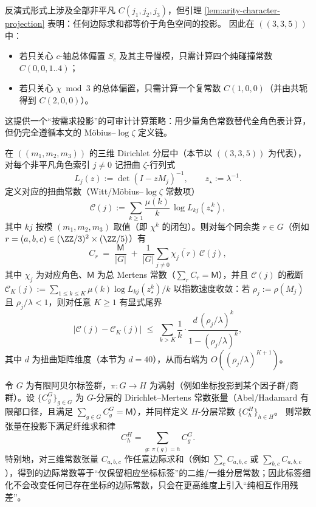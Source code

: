 \begin{remark}\label{rem:arity-335-projection-compression}
反演式形式上涉及全部非平凡 \(C(j_1,j_2,j_3)\)，但引理 \ref{lem:arity-character-projection} 表明：任何边际求和都等价于角色空间的投影。
因此在 \(((3,3,5))\) 中：
\begin{itemize}
  \item 若只关心 \(c\)-轴总体偏置 \(S_c\) 及其主导慢模，只需计算四个纯碰撞常数 \(C(0,0,1..4)\)；
  \item 若只关心 \(\chi\bmod 3\) 的总体偏置，只需计算一个复常数 \(C(1,0,0)\)（并由共轭得到 \(C(2,0,0)\)）。
\end{itemize}
这提供一个“按需求投影”的可审计计算策略：用少量角色常数替代全角色表计算，但仍完全遵循本文的 Möbius--\(\log\zeta\) 定义链。
\end{remark}

\begin{remark}\label{thm:arity-dirichlet-explicit-constant}
在 \(((m_1,m_2,m_3))\) 的三维 Dirichlet 分层中（本节以 \(((3,3,5))\) 为代表），对每个非平凡角色索引 \(j\neq 0\) 记扭曲 \(\zeta\)-行列式
\[
L_j(z):=\det(I-zM_j)^{-1},
\qquad
z_\star:=\lambda^{-1}.
\]
定义对应的扭曲常数（Witt/Möbius--\(\log\zeta\) 常数项）
\[
\mathcal{C}(j):=\sum_{k\ge 1}\frac{\mu(k)}{k}\,\log L_{kj}\!\left(z_\star^{\,k}\right),
\]
其中 \(kj\) 按模 \((m_1,m_2,m_3)\) 取值（即 \(\chi^{k}\) 的闭包）。则对每个同余类 \(r\in G\)（例如 \(r=(a,b,c)\in(\ZZ/3)^2\times(\ZZ/5)\)）有
\[
C_r
\;=\;
\frac{\mathsf{M}}{|G|}
\;+\;
\frac{1}{|G|}\sum_{j\neq 0}\overline{\chi_j(r)}\,\mathcal{C}(j),
\]
其中 \(\chi_j\) 为对应角色、\(\mathsf{M}\) 为总 Mertens 常数（\(\sum_r C_r=\mathsf{M}\)），并且 \(\mathcal{C}(j)\) 的截断
\(
\mathcal{C}_K(j):=\sum_{1\le k\le K}\mu(k)\log L_{kj}(z_\star^k)/k
\)
以指数速度收敛：若 \(\rho_j:=\rho(M_j)\) 且 \(\rho_j/\lambda<1\)，则对任意 \(K\ge 1\) 有显式尾界
\[
\left|\mathcal{C}(j)-\mathcal{C}_K(j)\right|
\;\le\;
\sum_{k>K}\frac{1}{k}\cdot
\frac{d\,(\rho_j/\lambda)^k}{1-(\rho_j/\lambda)^k},
\]
其中 \(d\) 为扭曲矩阵维度（本节为 \(d=40\)），从而右端为 \(O((\rho_j/\lambda)^{K+1})\)。
\end{remark}

\begin{remark}\label{thm:dirichlet-mertens-functoriality}
令 \(G\) 为有限阿贝尔标签群，\(\pi:G\to H\) 为满射（例如坐标投影到某个因子群/商群）。设
\(\{C^G_g\}_{g\in G}\) 为 \(G\)-分层的 Dirichlet--Mertens 常数张量（Abel/Hadamard 有限部口径，且满足 \(\sum_{g\in G}C^G_g=\mathsf{M}\)），并同样定义 \(H\)-分层常数 \(\{C^H_h\}_{h\in H}\)。
则常数张量在投影下满足纤维求和律
\[
C^H_h=\sum_{g:\ \pi(g)=h}C^G_g.
\]
特别地，对三维常数张量 \(C_{a,b,c}\) 作任意边际求和（例如 \(\sum_c C_{a,b,c}\) 或 \(\sum_{b,c}C_{a,b,c}\)），得到的边际常数等于“仅保留相应坐标标签”的二维/一维分层常数；因此标签细化不会改变任何已存在坐标的边际常数，只会在更高维度上引入“纯相互作用残差”。
\end{remark}


